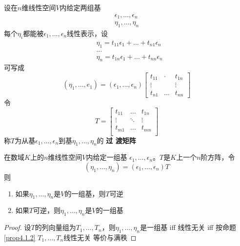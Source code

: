 \documentclass[11pt]{article}
\begin{document}
设在\(n\)维线性空间\(V\)内给定两组基
\begin{align*}
\epsilon_1,\dots,\epsilon_n\\
\eta_1,\dots,\eta_n
\end{align*}
每个\(\eta_i\)都能被\(\epsilon_1,\dots,\epsilon_n\)线性表示，设
\begin{align*}
&\eta_1=t_{11}\epsilon_1+\dots+t_{n1}\epsilon_n\\
&\dots\\
&\eta_n=t_{1n}\epsilon_1+\dots+t_{nn}\epsilon_n
\end{align*}
可写成
\begin{equation*}
(\eta_1,\dots,e_1)=(\epsilon_1,\dots,\epsilon_n)
\begin{bmatrix}
t_{11}&\cdot&t_{1n}\\
\vdots&&\vdots\\
t_{n1}&\dots&t_{nn}
\end{bmatrix}
\end{equation*}
令
\begin{equation*}
T=
\begin{bmatrix}
t_{11}&\dots&t_{1n}\\
\vdots&\ddots&\vdots\\
t_{m1}&\dots&t_{mn}\\
\end{bmatrix}
\end{equation*}
称\(T\)为从基\(\epsilon_1,\dots,\epsilon_n\)到基\(\eta_1,\dots,\eta_n\)的 \textbf{过
渡矩阵}

\begin{proposition}[]
在数域\(K\)上的\(n\)维线性空间\(V\)内给定一组基
\(\epsilon_1,\dots,\epsilon_n\)。\(T\)是\(K\)上一个\(n\)阶方阵，令
\begin{equation*}
(\eta_1,\dots,\eta_n)=(\epsilon_1,\dots,\epsilon_n)T
\end{equation*}
则
\begin{enumerate}
\item 如果\(\eta_1,\dots,\eta_n\)是\(V\)的一组基，则\(T\)可逆
\item 如果\(T\)可逆，则\(\eta_1,\dots,\eta_n\)是\(V\)的一组基
\end{enumerate}
\end{proposition}

\begin{proof}
设\(T\)的列向量组为\(T_1,\dots,T_n\)，则\(\eta_1,\dots,\eta_n\)是一组基 iff
线性无关 iff 按命题 \ref{prop4.1.2} \(T_1,\dots,T_n\)线性无关 等价与满秩
\end{proof}
\end{document}
